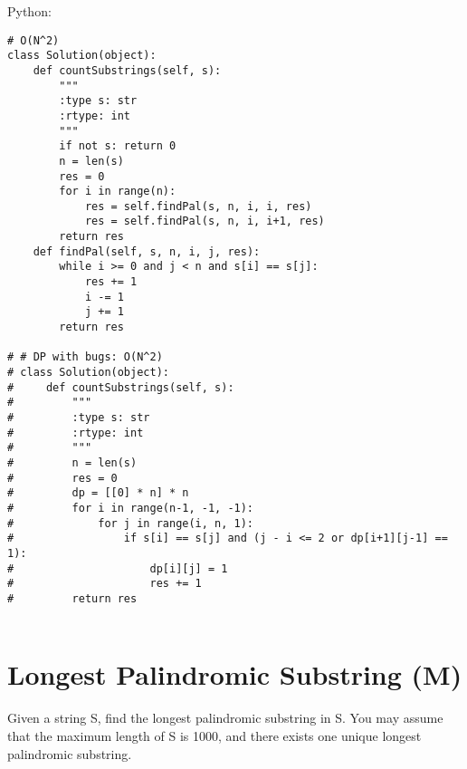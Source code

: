 Python:
\lstset{language=python}
\begin{lstlisting}
# O(N^2)
class Solution(object):
    def countSubstrings(self, s):
        """
        :type s: str
        :rtype: int
        """
        if not s: return 0
        n = len(s)
        res = 0
        for i in range(n):
            res = self.findPal(s, n, i, i, res)
            res = self.findPal(s, n, i, i+1, res)
        return res
    def findPal(self, s, n, i, j, res):
        while i >= 0 and j < n and s[i] == s[j]:
            res += 1
            i -= 1
            j += 1
        return res
    
# # DP with bugs: O(N^2)
# class Solution(object):
#     def countSubstrings(self, s):
#         """
#         :type s: str
#         :rtype: int
#         """
#         n = len(s)
#         res = 0
#         dp = [[0] * n] * n
#         for i in range(n-1, -1, -1):
#             for j in range(i, n, 1):
#                 if s[i] == s[j] and (j - i <= 2 or dp[i+1][j-1] == 1):
#                     dp[i][j] = 1
#                     res += 1
#         return res             
        

\end{lstlisting}
\lstset{language=C++}

\section{Longest Palindromic Substring (M)}
Given a string S, find the longest palindromic substring in S. You may assume that the maximum length of S is 1000, and there exists one unique longest palindromic substring.\\

